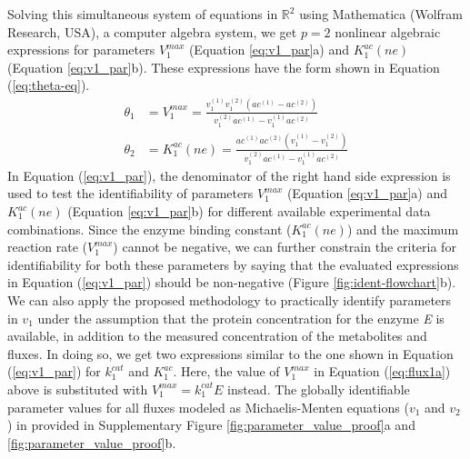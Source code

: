 \documentclass[10pt]{article}
\begin{document}
	Solving this simultaneous system of equations in $\mathbb{R}^2$ using Mathematica (Wolfram Research, USA), a computer algebra system, we get $p=2$ nonlinear algebraic expressions for parameters $V_1^{max}$ (Equation \ref{eq:v1_par}a) and $K_1^{ac}(ne)$ (Equation \ref{eq:v1_par}b). These expressions have the form shown in Equation (\ref{eq:theta-eq}).
	\begin{subequations}\label{eq:v1_par}
		\begin{align}		
		\theta_1 &= V_1^{max} = \frac{v_1^{(1)}v_1^{(2)}(ac^{(1)}-ac^{(2)})}{v_1^{(2)}ac^{(1)}-v_1^{(1)}ac^{(2)}}\\
		\theta_2 &= K_1^{ac}(ne) = \frac{ac^{(1)}ac^{(2)}(v_1^{(1)}-v_1^{(2)})}{v_1^{(2)}ac^{(1)}-v_1^{(1)}ac^{(2)}}
		\end{align}
	\end{subequations}
	In Equation (\ref{eq:v1_par}), the denominator of the right hand side expression is used to test the identifiability of parameters $V_1^{max}$ (Equation \ref{eq:v1_par}a) and $K_1^{ac}(ne)$ (Equation \ref{eq:v1_par}b) for different available experimental data combinations. Since the enzyme binding constant ($K_1^{ac}(ne)$) and the maximum reaction rate ($V_1^{max}$) cannot be negative, we can further constrain the criteria for identifiability for both these parameters by saying that the evaluated expressions in Equation (\ref{eq:v1_par}) should be non-negative (Figure \ref{fig:ident-flowchart}b). 
	We can also apply the proposed methodology to practically identify parameters in $v_1$ under the assumption that the protein concentration for the enzyme \textit{E} is available, in addition to the measured concentration of the metabolites and fluxes. In doing so, we get two expressions similar to the one shown in Equation (\ref{eq:v1_par}) for $k_1^{cat}$ and $K_1^{ac}$. Here, the value of $V_1^{max}$ in Equation (\ref{eq:flux1a}) above is substituted with $V_1^{max} = k_1^{cat}E$ instead. The globally identifiable parameter values for all fluxes modeled as Michaelis-Menten equations ($v_1$ and $v_2$) in provided in Supplementary Figure \ref{fig:parameter_value_proof}a and \ref{fig:parameter_value_proof}b. 	
	
\end{document}
